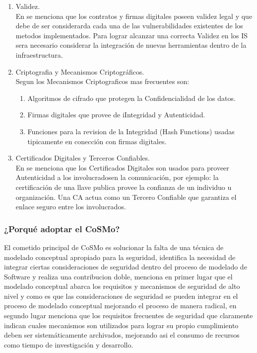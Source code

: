 \documentclass[runningheads,a4paper]{llncs}
\begin{document}
\begin{enumerate}
	\item Validez.\\
	
En \cite{CoSMoIntroduction} se menciona que los contratos y firmas digitales poseen validez legal y que debe de ser considerarda cada una de las vulnerabilidades existentes de los metodos implementados. Para lograr alcanzar una correcta Validez en los \gls{IS} sera necesario considerar la integración de nuevas herramientas dentro de la infraestructura.\\

	\item \gls{Criptografia} y Mecanismos Criptográficos.\\

Segun \cite{CoSMoIntroduction} los Mecanismos Criptograficos mas frecuentes son:\\

	\begin{enumerate}
		\item Algoritmos de cifrado que protegen la Confidencialidad de los datos.
		\item Firmas digitales que provee de iIntegridad y Autenticidad.
		\item Funciones para la revision de la Integridad (\gls{Hash Functions}) usadas tipicamente en conección con firmas digitales.\\
	\end{enumerate}

	\item Certificados Digitales y Terceros Confiables.\\
	
En \cite{CoSMoIntroduction} se menciona que los Certificados Digitales son usados para proveer Autenticidad a los involucradosen la comunicación, por ejemplo: la certificación de una llave publica provee la confianza de un individuo u organización. Una \gls{CA} actua como un Tercero Confiable que garantiza el enlace seguro entre los involucrados.

\end{enumerate}

\subsubsection{¿Porqué adoptar el \gls{CoSMo}?}
El cometido principal de \gls{CoSMo} es solucionar la falta de una técnica de modelado conceptual apropiado para la seguridad, \cite{CoSMoIntroduction} identifica la necesidad de integrar ciertas consideraciones de seguridad dentro del proceso de modelado de \gls{Software} y realiza una contribucion doble, \cite{CoSMoIntroduction} menciona en primer lugar que el modelado conceptual abarca los requisitos y mecanismos de seguridad de alto nivel y como es que las consideraciones de seguridad se pueden integrar en el proceso de modelado conceptual mejorando el proceso de manera radical, en segundo lugar menciona que los requisitos frecuentes de seguridad  que claramente indican cuales mecanismos son utilizados para lograr su propio cumplimiento deben ser sistemáticamente archivados, mejorando asi el consumo de recursos como tiempo de investigación y desarrollo. 
\end{document}
